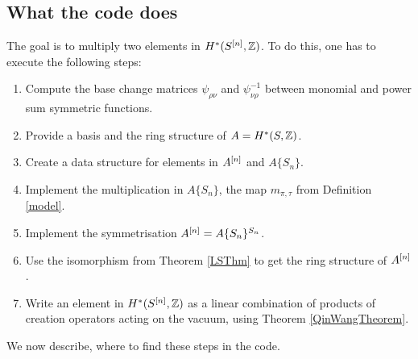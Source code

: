\subsection{What the code does}
The goal is to multiply two elements in $H^*(S^{[n]},\mathbb{Z})$. To do this, one has to execute the following steps:
\begin{enumerate}
 \item Compute the base change matrices $\psi_{\rho\nu}$ and $\psi_{\nu\rho}^{-1}$ between monomial and power sum symmetric functions.
 \item Provide a basis and the ring structure of $A=H^*(S,\mathbb{Z})$.
 \item Create a data structure for elements in $A^{[n]}$ and $A\{S_n\}$.
 \item Implement the multiplication in $A\{S_n\}$, \ie the map $m_{\pi,\tau}$ from Definition \ref{model}.
 \item Implement the symmetrisation $A^{[n]} = A\{S_n\}^{S_n}$.
 \item Use the isomorphism from Theorem \ref{LSThm} to get the ring structure of $A^{[n]}$.
 \item Write an element in $H^*(S^{[n]},\mathbb{Z})$ as a linear combination of products of creation operators acting on the vacuum, using Theorem \ref{QinWangTheorem}.
\end{enumerate}
We now describe, where to find these steps in the code.
